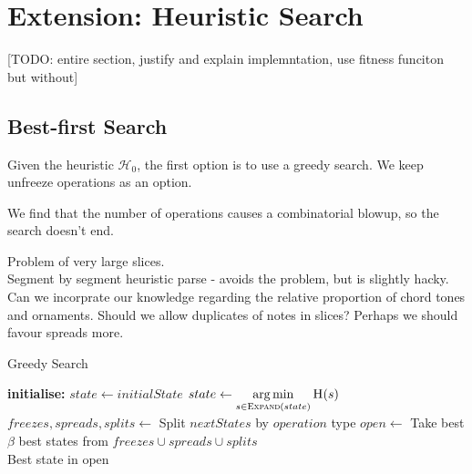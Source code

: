 \documentclass[12pt,a4paper,twoside,openany]{report} \usepackage[pdfborder={0 0 0}]{hyperref}    %
\theoremstyle{definition} \newtheorem{definition}{Definition}[section]
\begin{document}
    \FloatBarrier

    \section{Extension: Heuristic Search} 
    \label{sub:searchImpl}
    [TODO: entire section, justify and explain implemntation, use fitness funciton but without] 

    \subsection {Best-first Search}
    Given the heuristic $\mathcal{H}_0$, the first option is to use a greedy
    search. We keep unfreeze operations as an option.

    We find that the number of operations causes a combinatorial blowup, so the search doesn't end.

    Problem of very large slices.\\ Segment by segment heuristic parse - avoids the problem, but is slightly hacky. Can
    we incorprate our knowledge regarding the relative proportion of chord tones and ornaments. Should we allow
    duplicates of notes in slices? Perhaps we should favour spreads more. 

    \begin{algorithm}[ht] \caption{Greedy Search} \label{code:greedy} \begin{algorithmic} \State \textbf{initialise:
      } $state \gets initialState$  \State $state \gets \argmin\limits_{s \in
      \Call{Expand}{state}} \Call{H}{s} $ \State $freezes, spreads, splits \gets $ Split $nextStates$ by $operation$
      type \State $open \gets $ Take best $\beta$ best states from $freezes \cup spreads \cup splits$ \EndWhile \\
    \Return Best state in open \end{algorithmic} \end{algorithm}
\end{document}
